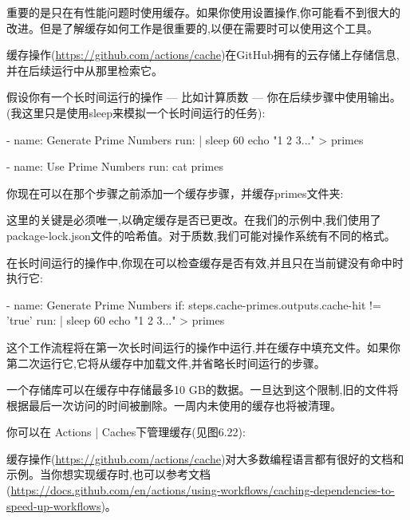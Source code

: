 
重要的是只在有性能问题时使用缓存。如果你使用设置操作,你可能看不到很大的改进。但是了解缓存如何工作是很重要的,以便在需要时可以使用这个工具。

缓存操作(\url{https://github.com/actions/cache})在GitHub拥有的云存储上存储信息,并在后续运行中从那里检索它。

假设你有一个长时间运行的操作 --- 比如计算质数 --- 你在后续步骤中使用输出。(我这里只是使用sleep来模拟一个长时间运行的任务):

\begin{shell}
- name: Generate Prime Numbers
  run: |
    sleep 60
    echo "1 2 3..." > primes

- name: Use Prime Numbers
  run: cat primes
\end{shell}

你现在可以在那个步骤之前添加一个缓存步骤，并缓存primes文件夹:


这里的关键是必须唯一,以确定缓存是否已更改。在我们的示例中,我们使用了package-lock.json文件的哈希值。对于质数,我们可能对操作系统有不同的格式。

在长时间运行的操作中,你现在可以检查缓存是否有效,并且只在当前键没有命中时执行它:

\begin{shell}
- name: Generate Prime Numbers
  if: steps.cache-primes.outputs.cache-hit != 'true'
  run: |
    sleep 60
    echo "1 2 3..." > primes
\end{shell}

这个工作流程将在第一次长时间运行的操作中运行,并在缓存中填充文件。如果你第二次运行它,它将从缓存中加载文件,并省略长时间运行的步骤。


一个存储库可以在缓存中存储最多10 GB的数据。一旦达到这个限制,旧的文件将根据最后一次访问的时间被删除。一周内未使用的缓存也将被清理。

你可以在 Actions | Caches下管理缓存(见图6.22):


缓存操作(\url{https://github.com/actions/cache})对大多数编程语言都有很好的文档和示例。当你想实现缓存时,也可以参考文档(\url{https://docs.github.com/en/actions/using-workflows/caching-dependencies-to-speed-up-workflows})。